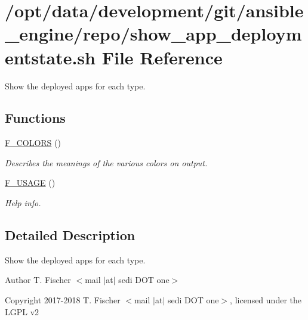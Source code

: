 \hypertarget{show__app__deploymentstate_8sh}{}\section{/opt/data/development/git/ansible\+\_\+engine/repo/show\+\_\+app\+\_\+deploymentstate.sh File Reference}
\label{show__app__deploymentstate_8sh}


Show the deployed apps for each type.  


\subsection*{Functions}
\begin{DoxyCompactItemize}
\item 
\mbox{\label{show__app__deploymentstate_8sh_aa39d993d255cc55d41d7704bb86bb962}} 
\mbox{\hyperlink{show__app__deploymentstate_8sh_aa39d993d255cc55d41d7704bb86bb962}{F\+\_\+\+C\+O\+L\+O\+RS}} ()
\begin{DoxyCompactList}\small\item\em Describes the meanings of the various colors on output. \end{DoxyCompactList}\item 
\mbox{\label{show__app__deploymentstate_8sh_abbb71bad0f7277cfb53b278ad3ca550d}} 
\mbox{\hyperlink{show__app__deploymentstate_8sh_abbb71bad0f7277cfb53b278ad3ca550d}{F\+\_\+\+U\+S\+A\+GE}} ()
\begin{DoxyCompactList}\small\item\em Help info. \end{DoxyCompactList}\end{DoxyCompactItemize}


\subsection{Detailed Description}
Show the deployed apps for each type. 

\begin{DoxyAuthor}{Author}
T. Fischer $<$mail $\vert$at$\vert$ sedi D\+OT one$>$ 
\end{DoxyAuthor}
\begin{DoxyCopyright}{Copyright}
2017-\/2018 T. Fischer $<$mail $\vert$at$\vert$ sedi D\+OT one$>$, licensed under the L\+G\+PL v2 
\end{DoxyCopyright}
